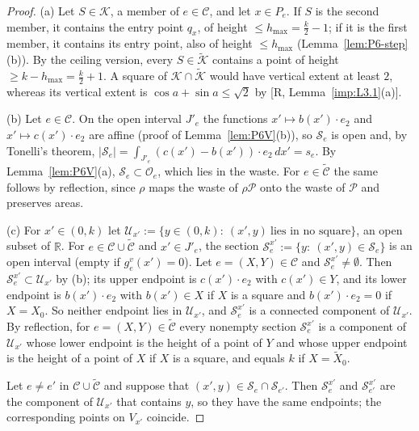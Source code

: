 \documentclass[11pt]{amsart}
\newcommand{\R}{\mathbb R}
\newcommand{\cP}{\mathcal P}
\newcommand{\hmax}{h_{\max}}
\theoremstyle{definition}
\theoremstyle{remark}
\numberwithin{equation}{section}
\begin{document}
\begin{proof}
(a) Let $S\in\mathcal K$, a member of $e\in\mathcal C$, and let $x\in P_e$. If $S$ is the second member, it contains
the entry point $q_x$, of height $\le\hmax=\frac k2-1$; if it is the first member, it contains its entry point, also
of height $\le\hmax$ (Lemma~\ref{lem:P6-step}(b)). By the ceiling version, every $S\in\tilde{\mathcal K}$ contains a
point of height $\ge k-\hmax=\frac k2+1$. A square of $\mathcal K\cap\tilde{\mathcal K}$ would have vertical extent at
least $2$, whereas its vertical extent is $\cos a+\sin a\le\sqrt2$ by [R, Lemma~\ref{imp:L3.1}(a)].

(b) Let $e\in\mathcal C$. On the open interval $J'_e$ the functions $x'\mapsto b(x')\cdot e_2$ and
$x'\mapsto c(x')\cdot e_2$ are affine (proof of Lemma~\ref{lem:P6V}(b)), so $\mathcal S_e$ is open and, by Tonelli's
theorem, $|\mathcal S_e|=\int_{J'_e}(c(x')-b(x'))\cdot e_2\,dx'=s_e$. By Lemma~\ref{lem:P6V}(a),
$\mathcal S_e\subset\mathcal O_e$, which lies in the waste. For $e\in\tilde{\mathcal C}$ the same follows by
reflection, since $\rho$ maps the waste of $\rho\cP$ onto the waste of $\cP$ and preserves areas.

(c) For $x'\in(0,k)$ let $\mathcal U_{x'}:=\{y\in(0,k):\ (x',y)\ \text{lies in no square}\}$, an open subset of $\R$.
For $e\in\mathcal C\cup\tilde{\mathcal C}$ and $x'\in J'_e$, the section $\mathcal S_e^{x'}:=\{y:\ (x',y)\in\mathcal S_e\}$
is an open interval (empty if $g^v_e(x')=0$). Let $e=(X,Y)\in\mathcal C$ and $\mathcal S_e^{x'}\neq\emptyset$. Then
$\mathcal S_e^{x'}\subset\mathcal U_{x'}$ by (b); its upper endpoint is $c(x')\cdot e_2$ with $c(x')\in Y$, and its lower
endpoint is $b(x')\cdot e_2$ with $b(x')\in X$ if $X$ is a square and $b(x')\cdot e_2=0$ if $X=X_0$. So neither
endpoint lies in $\mathcal U_{x'}$, and $\mathcal S_e^{x'}$ is a connected component of $\mathcal U_{x'}$. By reflection,
for $e=(X,Y)\in\tilde{\mathcal C}$ every nonempty section $\mathcal S_e^{x'}$ is a component of $\mathcal U_{x'}$ whose
lower endpoint is the height of a point of $Y$ and whose upper endpoint is the height of a point of $X$ if $X$ is a
square, and equals $k$ if $X=\tilde X_0$.

Let $e\neq e'$ in $\mathcal C\cup\tilde{\mathcal C}$ and suppose that $(x',y)\in\mathcal S_e\cap\mathcal S_{e'}$. Then
$\mathcal S_e^{x'}$ and $\mathcal S_{e'}^{x'}$ are the component of $\mathcal U_{x'}$ that contains $y$, so they have the
same endpoints; the corresponding points on $V_{x'}$ coincide.


\end{proof}
\end{document}
